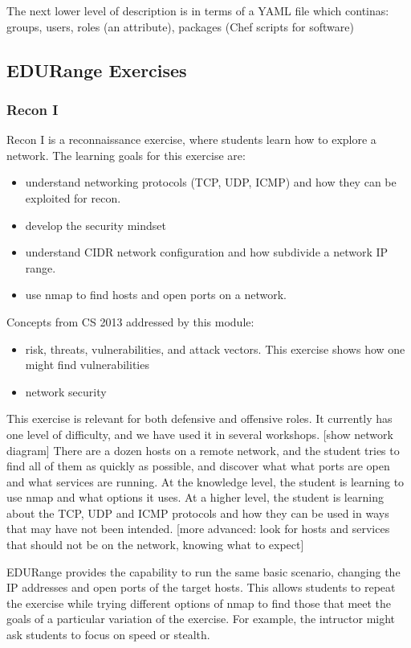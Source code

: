 The next lower level of description is in terms of a YAML file which continas:
 groups, users, roles (an attribute), packages (Chef scripts for software)


\subsection*{EDURange Exercises}
\subsubsection{Recon I}
Recon I  is a reconnaissance exercise, where students learn how to explore a network.
The learning goals for this exercise are:
\begin{itemize}
\item understand networking protocols (TCP, UDP, ICMP) and how they can be exploited for recon.
\item develop the security mindset
\item understand CIDR network configuration and how subdivide a network IP range.
\item use nmap to find hosts and open ports on a network.
\end{itemize}
Concepts from CS 2013 addressed by this module:
\begin{itemize}
\item  risk, threats, vulnerabilities, and attack vectors.  This exercise shows how one might 
  find vulnerabilities
\item network security
\end{itemize}


This exercise is relevant for both defensive and offensive roles.  It currently has one level of difficulty,
and we have used it in several workshops.
[show network diagram]
There are a dozen hosts on a remote network, and the student tries to find all of them as quickly as 
possible, and discover what what ports are open and what services are running.  At the knowledge level,
the student is learning to use nmap and what options it uses.  At a higher level, the student is learning
about the TCP, UDP and ICMP protocols and how they can be used in ways that may have not been intended.
[more advanced: look for hosts and services that should not be on the network, knowing what to expect]

EDURange provides the capability to run the same basic scenario, changing the IP addresses and open ports
of the target hosts.  This allows students to repeat the exercise while trying different options of nmap to
find those that meet the goals of a particular variation of the exercise.  For example, the intructor
might ask students to focus on speed or stealth.

